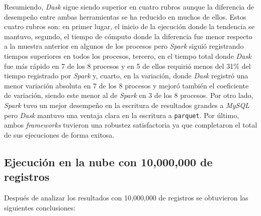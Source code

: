 Resumiendo, \textit{Dask} sigue siendo superior en cuatro rubros aunque la diferencia de desempeño entre ambas herramientas se ha reducido en muchos de ellos. Estos cuatro rubros son: en primer lugar, el inicio de la ejecución donde la tendencia se mantuvo, segundo, el tiempo de cómputo donde la diferencia fue menor respecto a la muestra anterior en algunos de los procesos pero \textit{Spark} siguió registrando tiempos superiores en todos los procesos, tercero, en el tiempo total donde \textit{Dask} fue más rápido en 7 de los 8 procesos y en 5 de ellos requirió menos del 31\% del tiempo registrado por \textit{Spark} y, cuarto, en la variación, donde \textit{Dask} registró una menor variación absoluta en 7 de los 8 procesos y mejoró también el coeficiente de variación, siendo este menor al de \textit{Spark} en 3 de los 8 procesos. Por otro lado, \textit{Spark} tuvo un mejor desempeño en la escritura de resultados grandes a \textit{MySQL} pero \textit{Dask} mantuvo una ventaja clara en la escritura a \texttt{parquet}. Por último, ambos \textit{frameworks} tuvieron una robustez satisfactoria ya que completaron el total de sus ejecuciones de forma exitosa.


\subsection{Ejecución en la nube con 10,000,000 de registros}

Después de analizar los resultados con 10,000,000 de registros se obtuvieron las siguientes conclusiones:

